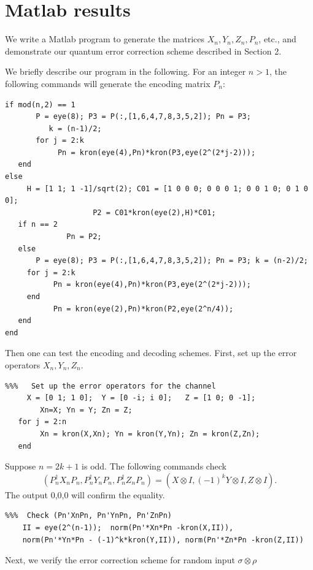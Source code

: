 \documentclass[11pt]{article}
\begin{document}
\section{Matlab results}

We write a Matlab program to generate the matrices $X_n, Y_n, Z_n, P_n$,
etc.,  and demonstrate our quantum error correction scheme
described in Section 2.

We briefly describe our program in the following.
For an integer $n > 1$, the following commands will generate the encoding 
matrix $P_n$:
\begin{verbatim}
if mod(n,2) == 1   
       P = eye(8); P3 = P(:,[1,6,4,7,8,3,5,2]); Pn = P3;
          k = (n-1)/2;
       for j = 2:k
            Pn = kron(eye(4),Pn)*kron(P3,eye(2^(2*j-2)));
   end 
else 
     H = [1 1; 1 -1]/sqrt(2); C01 = [1 0 0 0; 0 0 0 1; 0 0 1 0; 0 1 0 0]; 
                    P2 = C01*kron(eye(2),H)*C01;   
   if n == 2
              Pn = P2;
   else
       P = eye(8); P3 = P(:,[1,6,4,7,8,3,5,2]); Pn = P3; k = (n-2)/2;
     for j = 2:k
           Pn = kron(eye(4),Pn)*kron(P3,eye(2^(2*j-2)));
     end  
           Pn = kron(eye(2),Pn)*kron(P2,eye(2^n/4));
   end
end
\end{verbatim}
Then one can test the encoding and decoding schemes. First, set up the error operators
$X_n, Y_n, Z_n$. 
\begin{verbatim}
%%%   Set up the error operators for the channel
     X = [0 1; 1 0];  Y = [0 -i; i 0];   Z = [1 0; 0 -1];  
        Xn=X; Yn = Y; Zn = Z;
   for j = 2:n
        Xn = kron(X,Xn); Yn = kron(Y,Yn); Zn = kron(Z,Zn);
   end
\end{verbatim}
Suppose $n = 2k+1$ is odd. The following commands check 
\begin{equation} \label{odd-a}
(P_n^\dag X_nP_n, P_n^\dag Y_nP_n, P_n^\dag Z_nP_n) = 
(X\otimes I, (-1)^k Y \otimes I, Z\otimes I).
\end{equation}
The output 0,0,0 will confirm the equality.
\begin{verbatim}
%%%  Check (Pn'XnPn, Pn'YnPn, Pn'ZnPn)
    II = eye(2^(n-1));  norm(Pn'*Xn*Pn -kron(X,II)), 
    norm(Pn'*Yn*Pn - (-1)^k*kron(Y,II)), norm(Pn'*Zn*Pn -kron(Z,II))
\end{verbatim}
Next, we verify the error correction scheme for random input $\sigma \otimes \rho$
\end{document}
